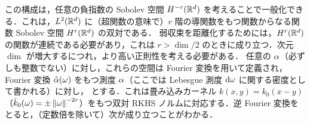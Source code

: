 \begin{example}\label{exp-sobolev-neg}
	この構成は，任意の負指数の Sobolev 空間 $H^{-r}(\mathbb{R}^d)$ を考えることで一般化できる．これは，$L^2(\mathbb{R}^d)$ に（超関数の意味で）$r$ 階の導関数をもつ関数からなる関数 Sobolev 空間 $H^{r}(\mathbb{R}^d)$ の双対である．
	弱収束を距離化するためには，$H^{r}(\mathbb{R}^d)$ の関数が連続である必要があり，これは $r>\dim/2$ のときに成り立つ．次元 $\dim$ が増大するにつれ，より高い正則性を考える必要がある．
	任意の $\alpha$（必ずしも整数でない）に対し，これらの空間は Fourier 変換を用いて定義され，Fourier 変換 $\hat {\alpha}(\omega)$ をもつ測度 $\alpha$（ここでは Lebesgue 測度 $\mathrm{d}\omega$ に関する密度として書かれる）に対し，
	とする．これは畳み込みカーネル $k(x,y)=k_0(x-y)$（$\hat k_0(\omega) = \pm \left\| \omega \right\|^{-2r}$）をもつ双対 RKHS ノルムに対応する．逆 Fourier 変換をとると，（定数倍を除いて）次が成り立つことがわかる．
\end{example}




